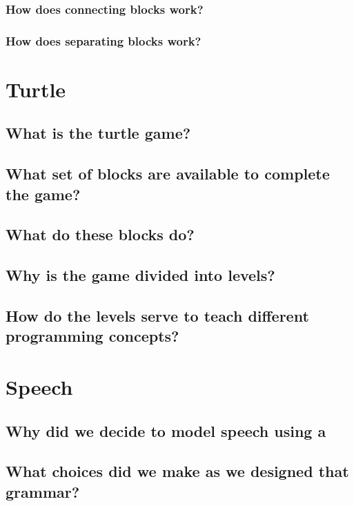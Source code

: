 \documentclass[]{article}
\begin{document}
\subsubsection{How does connecting blocks work?}

\subsubsection{How does separating blocks work?}


\section{Turtle}

\subsection{What is the turtle game?}

\subsection{What set of blocks are available to complete the game?}

\subsection{What do these blocks do?}

\subsection{Why is the game divided into levels?}

\subsection{How do the levels serve to teach different programming concepts?}


\section{Speech}

\subsection{Why did we decide to model speech using a} %

\subsection{What choices did we make as we designed that grammar?}
\end{document}
